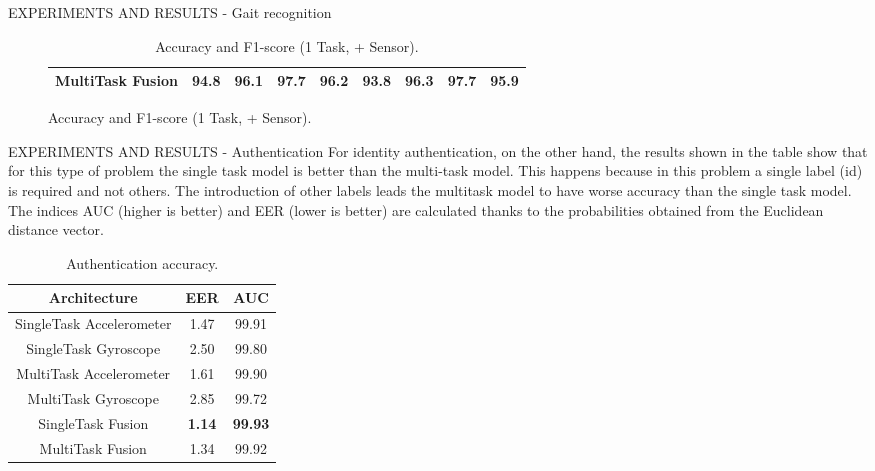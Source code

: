 \begin{frame}{EXPERIMENTS AND RESULTS - Gait recognition}
\begin{minipage}{\linewidth}
\begin{minipage}{0.45\linewidth}
\begin{figure}[htbp]
\begin{table}[h!]
\begin{adjustbox}{max width=\textwidth}
\begin{tabular}{|c||ccc|c||ccc|c|}
                            MultiTask Fusion & \bfseries{94.8} & \bfseries{96.1} & \bfseries{97.7} & \bfseries{96.2} & \bfseries{93.8} & \bfseries{96.3} & \bfseries{97.7} & \bfseries{95.9}\\
                        \hline 
                    \end{tabular}
                    \end{adjustbox}
                    \caption{Accuracy and F1-score (1 Task, + Sensor).}
                    \label{table accuracy and F1 (+ Task, + Sensor)}
                \end{table}
            \end{figure}
        \end{minipage}
    \end{minipage}
\end{frame}

\begin{frame}{EXPERIMENTS AND RESULTS - Authentication}
    For identity authentication, on the other hand, the results shown in the table show that for this type of problem the single task model is better than the multi-task model. This happens because in this problem a single label (id) is required and not others. The introduction of other labels leads the multitask model to have worse accuracy than the single task model. The indices AUC (higher is better) and EER (lower is better) are calculated thanks to the probabilities obtained from the Euclidean distance vector.
    \begin{table}[h!]
        \centering
        \begin{adjustbox}{max width=\textwidth}
        \begin{tabular}{|c|cc|}
            \hline
            Architecture & EER & AUC\\
            \hline
            SingleTask Accelerometer & 1.47 & 99.91\\
            SingleTask Gyroscope & 2.50 & 99.80\\
            \hline
            MultiTask Accelerometer & 1.61 & 99.90\\
            MultiTask Gyroscope & 2.85 & 99.72\\
            \hline
            SingleTask Fusion & \bfseries{1.14} & \bfseries{99.93}\\
            \hline
            MultiTask Fusion & 1.34 & 99.92\\
            \hline
        \end{tabular}
        \end{adjustbox}
        \caption{Authentication accuracy.}
        \label{Authentication}
    \end{table}
\end{frame}

